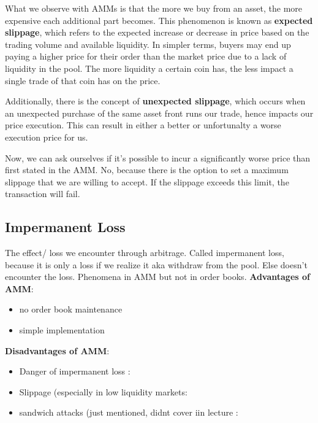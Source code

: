 \documentclass{article}
\begin{document}
What we observe with AMMs is that the more we buy from an asset, the more expensive each additional part becomes. This phenomenon is known as \textbf{expected slippage}, which refers to the expected increase or decrease in price based on the trading volume and available liquidity. In simpler terms, buyers may end up paying a higher price for their order than the market price due to a lack of liquidity in the pool. The more liquidity a certain coin has, the less impact a single trade of that coin has on the price.

Additionally, there is the concept of \textbf{unexpected slippage}, which occurs when an unexpected purchase of the same asset front runs our trade, hence impacts our price execution. This can result in either a better or unfortunalty a worse execution price for us.

Now, we can ask ourselves if it's possible to incur a significantly worse price than first stated in the AMM. No, because there is the option to set a maximum slippage that we are willing to accept. If the slippage exceeds this limit, the transaction will fail.

\subsection{Impermanent Loss} %
The effect/ loss we encounter through arbitrage. Called impermanent loss, because it is only a loss if we realize it aka withdraw from the pool. Else doesn't encounter the loss. Phenomena in AMM but not in order books.
\textbf{Advantages of AMM}:
\begin{itemize}
    \item {no order book maintenance}
    \item {simple implementation}

\end{itemize}
\textbf{Disadvantages of AMM}:
\begin{itemize}
    \item {Danger of impermanent loss }: 
    \item {Slippage (especially in low liquidity markets}: 
    \item {sandwich attacks (just mentioned, didnt cover iin lecture }:  
\end{itemize}
\end{document}

